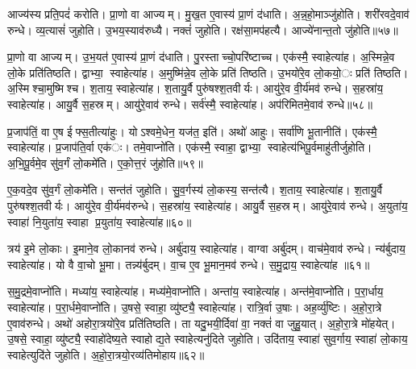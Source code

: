 आज्य॑स्य प्रति॒पदं॑ करोति। प्रा॒णो वा आज्यम्। मु॒ख॒त ए॒वास्य॑ प्रा॒णं द॑धाति। अ॒न्न॒हो॒माञ्जु॑होति। शरी॑रवदे॒वाव॑ रुन्धे। व्य॒त्यासं॑ जुहोति। उ॒भय॒स्याव॑रुध्यै। नक्तं॑ जुहोति। रक्ष॑सा॒मप॑हत्यै। आज्ये॑नान्त॒तो जु॑होति॥५७॥

प्रा॒णो वा आज्यम्। उ॒भ॒यत॑ ए॒वास्य॑ प्रा॒णं द॑धाति। पु॒रस्ताच्चो॒परि॑ष्टाच्च। एक॑स्मै॒ स्वाहेत्या॑ह। अ॒स्मिन्ने॒व लो॒के प्रति॑तिष्ठति। द्वाभ्या॒ स्वाहेत्या॑ह। अ॒मुष्मि॑न्ने॒व लो॒के प्रति॑ तिष्ठति। उ॒भयो॑रे॒व लो॒कयो॒ः प्रति॑ तिष्ठति। अ॒स्मिश्चा॒मुष्मिश्च। श॒ताय॒ स्वाहेत्या॑ह। श॒तायु॒र्वै पुरु॑षश्श॒तवीर्यः। आयु॑रे॒व वी॒र्य॑मव॑ रुन्धे। स॒हस्रा॑य॒ स्वाहेत्या॑ह। आयु॒र्वै स॒हस्रम्। आयु॑रे॒वाव॑ रुन्धे। सर्व॑स्मै॒ स्वाहेत्या॑ह। अप॑रिमितमे॒वाव॑ रुन्धे॥५८॥


प्र॒जाप॑तिं॒ वा ए॒ष ईफ्स॒तीत्या॑हुः। योऽश्वमे॒धेन॒ यज॑त॒ इति॑। अथो॑ आहुः। सर्वा॑णि भू॒तानीति॑। एक॑स्मै॒ स्वाहेत्या॑ह। प्र॒जाप॑ति॒र्वा एक॑ः। तमे॒वाप्नो॑ति। एक॑स्मै॒ स्वाहा॒ द्वाभ्या॒ स्वाहेत्य॑भिपू॒र्वमाहु॑तीर्जुहोति। अ॒भि॒पू॒र्वमे॒व सु॑व॒र्गं लो॒कमे॑ति। ए॒को॒त्त॒रं जु॑होति॥५९॥

ए॒क॒वदे॒व सु॑व॒र्गं लो॒कमे॑ति। सन्त॑तं जुहोति। सु॒व॒र्गस्य॑ लो॒कस्य॒ सन्त॑त्यै। श॒ताय॒ स्वाहेत्या॑ह। श॒तायु॒र्वै पुरु॑षश्श॒तवीर्यः। आयु॑रे॒व वी॒र्य॑मव॑रुन्धे। स॒हस्रा॑य॒ स्वाहेत्या॑ह। आयु॒र्वै स॒हस्रम्। आयु॑रे॒वाव॑ रुन्धे। अ॒युता॑य॒ स्वाहा॑ नि॒युता॑य॒ स्वाहा प्र॒युता॑य॒ स्वाहेत्या॑ह॥६०॥

त्रय॑ इ॒मे लो॒काः। इ॒माने॒व लो॒कानव॑ रुन्धे। अर्बु॑दाय॒ स्वाहेत्या॑ह। वाग्वा अर्बु॑दम्। वाच॑मे॒वाव॑ रुन्धे। न्य॑र्बुदाय॒ स्वाहेत्या॑ह। यो वै वा॒चो भू॒मा। तन्न्य॑र्बुदम्। वा॒च ए॒व भू॒मान॒मव॑ रुन्धे। स॒मु॒द्राय॒ स्वाहेत्या॑ह ॥६१॥

स॒मु॒द्रमे॒वाप्नो॑ति। मध्या॑य॒ स्वाहेत्या॑ह। मध्य॑मे॒वाप्नो॑ति। अन्ता॑य॒ स्वाहेत्या॑ह। अन्त॑मे॒वाप्नो॑ति। प॒रा॒र्धाय॒ स्वाहेत्या॑ह। प॒रा॒र्धमे॒वाप्नो॑ति। उ॒षसे॒ स्वाहा॒ व्यु॑ष्ट्यै॒ स्वाहेत्या॑ह। रात्रि॒र्वा उ॒षाः। अह॒र्व्यु॑ष्टिः। अ॒हो॒रा॒त्रे ए॒वाव॑रुन्धे। अथो॑ अहोरा॒त्रयो॑रे॒व प्रति॑तिष्ठति। ता यदु॒भयी॒र्दिवा॑ वा॒ नक्तं॑ वा जुहु॒यात्। अ॒हो॒रा॒त्रे मो॑हयेत्। उ॒षसे॒ स्वाहा॒ व्यु॑ष्ट्यै॒ स्वाहो॑देष्य॒ते स्वाहोद्य॒ते स्वाहेत्यनु॑दिते जुहोति। उदि॑ताय॒ स्वाहा॑ सुव॒र्गाय॒ स्वाहा॑ लो॒काय॒ स्वाहेत्युदि॑ते जुहोति। अ॒हो॒रा॒त्रयो॒रव्य॑तिमोहाय॥६२॥



